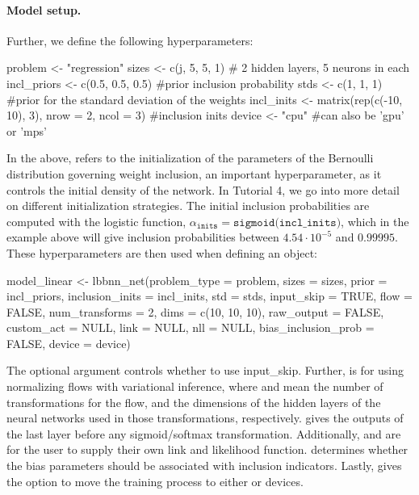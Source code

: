 \paragraph{Model setup.} Further, we define the following hyperparameters:
\begin{example}
problem <- "regression"
sizes <- c(j, 5, 5, 1) # 2 hidden layers, 5 neurons in each
incl_priors <- c(0.5, 0.5, 0.5) #prior inclusion probability
stds <- c(1, 1, 1) #prior for the standard deviation of the weights
incl_inits <- matrix(rep(c(-10, 10), 3), nrow = 2, ncol = 3) #inclusion inits
device <- "cpu" #can also be 'gpu' or 'mps'
\end{example}
In the above,  refers to the initialization of the parameters of the Bernoulli distribution governing weight inclusion, an important hyperparameter, as it controls the initial density of the network. In Tutorial 4, we go into more detail on different initialization strategies. The initial inclusion probabilities are computed with the logistic function, $\alpha_{\texttt{inits}} = \texttt{sigmoid(incl\_inits)}$, which in the example above will give inclusion probabilities between $4.54\cdot10^{-5}$ and $0.99995$. These hyperparameters are then used when defining an  object:
\begin{example}
model_linear <- lbbnn_net(problem_type = problem, sizes = sizes,
                              prior = incl_priors, inclusion_inits = incl_inits,
                              std = stds, input_skip = TRUE, flow = FALSE,
                              num_transforms = 2, dims = c(10, 10, 10),
                              raw_output = FALSE, custom_act = NULL,
                              link = NULL, nll = NULL,
                              bias_inclusion_prob = FALSE, device = device)
\end{example}
The optional argument 
controls whether to use input\_skip. Further,  is for using normalizing flows with variational inference, where  and  mean the number of transformations for the flow, and the dimensions of the hidden layers of the neural networks used in those transformations, respectively.  gives the outputs of the last layer before any sigmoid/softmax transformation. Additionally,  and  are for the user to supply their own link and likelihood function.  determines whether the bias parameters should be associated with inclusion indicators. Lastly,  gives the option to move the training process to either  or  devices. 

